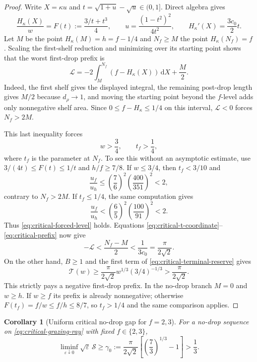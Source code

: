 \documentclass[11pt]{article}
\newtheorem{corollary}[theorem]{Corollary}
\theoremstyle{remark}
\newcommand{\dd}{\,\mathrm d}
\begin{document}
\begin{proof}
Write $X=\kappa u$ and
$t=\sqrt{1+u}-\sqrt u\in(0,1]$.  Direct algebra gives
\begin{equation}
 \frac{H_\kappa(X)}w=F(t):=\frac{3/t+t^3}{4},
 \qquad u=\frac{(1-t^2)^2}{4t^2},
 \qquad H_\kappa'(X)=\frac{3c_0}{2}t.
 \label{eq:critical-t-coordinate}
\end{equation}
Let $M$ be the point $H_\kappa(M)=h=f-1/4$ and $N_f\geq M$ the point
$H_\kappa(N_f)=f$.  Scaling the first-shelf reduction and minimizing over
its starting point shows that the worst first-drop prefix is
\begin{equation}
 \mathcal L=-2\int_M^{N_f}(f-H_\kappa(X))\dd X+\frac M2.
 \label{eq:critical-prefix}
\end{equation}
Indeed, the first shelf gives the displayed integral, the remaining
post-drop length gives $M/2$ because $d_\rho\to1$, and moving the starting
point beyond the $f$-level adds only nonnegative shelf area.
Since $0\leq f-H_\kappa\leq1/4$ on this interval,
$\mathcal L<0$ forces $N_f>2M$.

This last inequality forces
\begin{equation}
 w>\frac34,\qquad t_f>\frac14,
 \label{eq:critical-forced-level}
\end{equation}
where $t_f$ is the parameter at $N_f$.  To see this without an asymptotic
estimate, use $3/(4t)\leq F(t)\leq1/t$ and $h/f\geq7/8$.
If $w\leq3/4$, then $t_f<3/10$ and
\[
 \frac{u_f}{u_h}\leq
 \left(\frac76\right)^2\left(\frac{400}{351}\right)^2<2,
\]
contrary to $N_f>2M$.  If $t_f\leq1/4$, the same computation gives
\[
 \frac{u_f}{u_h}<
 \left(\frac65\right)^2\left(\frac{100}{91}\right)^2<2.
\]
Thus \eqref{eq:critical-forced-level} holds.  Equations
\eqref{eq:critical-t-coordinate}--\eqref{eq:critical-prefix} now give
\[
 -\mathcal L<\frac{N_f-M}{2}
 <\frac1{3c_0}=\frac\pi{2\sqrt2}.
\]
On the other hand, $B\geq1$ and the first term of
\eqref{eq:critical-terminal-reserve} gives
\[
 \mathcal T(w)\geq\frac\pi{2\sqrt2}
 w^{1/3}(3/4)^{-1/3}>\frac\pi{2\sqrt2}.
\]
This strictly pays a negative first-drop prefix.  In the no-drop branch
$M=0$ and $w\geq h$.  If $w\geq f$ its prefix is already nonnegative;
otherwise $F(t_f)=f/w\leq f/h\leq8/7$, so $t_f>1/4$ and the same
comparison applies.
\end{proof}

\begin{corollary}[Uniform critical no-drop gap for $f=2,3$]
\label{cor:critical-low-floor-gap}
For a no-drop sequence on \eqref{eq:critical-grazing-ray} with fixed
$f\in\{2,3\}$,
\begin{equation}
 \boxed{
 \liminf_{\varepsilon\downarrow0}\sqrt\varepsilon\,\mathcal S
 \geq\gamma_0:=\frac\pi{2\sqrt2}
 \left[\left(\frac73\right)^{1/3}-1\right]>\frac13.}
 \label{eq:critical-low-floor-gap}
\end{equation}
\end{corollary}
\end{document}
